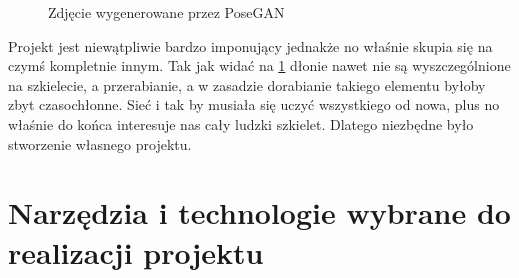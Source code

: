 \documentclass[12pt]{article}
\begin{document}
\begin{sloppypar}
{{\begin{figure}[H]
      \caption{Zdjęcie wygenerowane przez PoseGAN \cite{pose-gan}}
      \label{fig:pose-gan-przyklady}
    \end{figure}
    Projekt jest niewątpliwie bardzo imponujący jednakże no właśnie skupia się na czymś kompletnie innym. 
    Tak jak widać na \ref{fig:pose-gan-przyklady} dłonie nawet nie są wyszczególnione na szkielecie, a przerabianie, a w zasadzie dorabianie takiego elementu byłoby zbyt czasochłonne.
    Sieć i tak by musiała się uczyć wszystkiego od nowa, plus no właśnie do końca interesuje nas cały ludzki szkielet. Dlatego niezbędne było stworzenie własnego projektu.
  }
}

\section{Narzędzia i technologie wybrane do realizacji projektu}
{
}
\end{sloppypar}
\end{document}
